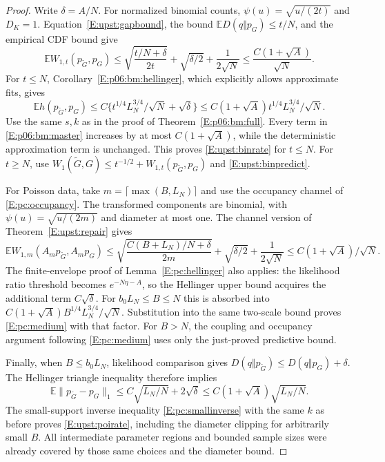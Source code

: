 \documentclass[11pt,a4paper]{article}
\theoremstyle{definition}
\theoremstyle{remark}
\numberwithin{equation}{section}
\begin{document}
\begin{proof}
Write $\delta=A/N$.
For normalized binomial counts, $\psi(u)=\sqrt{u/(2t)}$ and
$D_K=1$. Equation~\eqref{E:upst:gapbound}, the bound
$\mathbb E D(q\Vert p_G)\le t/N$, and the empirical CDF bound give
\begin{equation}\label{E:upst:binpredict}
 \mathbb E W_{1,t}(p_{\widetilde G},p_G)
 \le \sqrt{\frac{t/N+\delta}{2t}}+
       \sqrt{\delta/2}+\frac1{2\sqrt N}
 \le\frac{C(1+\sqrt A)}{\sqrt N}.
\end{equation}
For $t\le N$, Corollary~\ref{E:p06:bm:hellinger}, which explicitly
allows approximate fits, gives
\[
 \mathbb E h(p_{\widetilde G},p_G)
 \le C\{t^{1/4}L_N^{3/4}/\sqrt N+\sqrt\delta\}
 \le C(1+\sqrt A)t^{1/4}L_N^{3/4}/\sqrt N.
\]
Use the same $s,k$ as in the proof of
Theorem~\ref{E:p06:bm:full}. Every term in
\eqref{E:p06:bm:master} increases by at most $C(1+\sqrt A)$, while the
deterministic approximation term is unchanged. This proves
\eqref{E:upst:binrate} for $t\le N$. For $t\ge N$, use
$W_1(\widetilde G,G)\le t^{-1/2}
 +W_{1,t}(p_{\widetilde G},p_G)$ and \eqref{E:upst:binpredict}.

For Poisson data, take $m=\lceil\max(B,L_N)\rceil$ and use the
occupancy channel of \eqref{E:pc:occupancy}. The transformed components
are binomial, with $\psi(u)=\sqrt{u/(2m)}$ and diameter at most one.
The channel version of Theorem~\ref{E:upst:repair} gives
\[
 \mathbb E W_{1,m}(A_mp_{\widetilde G},A_mp_G)
 \le\sqrt{\frac{C(B+L_N)/N+\delta}{2m}}
       +\sqrt{\delta/2}+\frac1{2\sqrt N}
 \le C(1+\sqrt A)/\sqrt N.
\]
The finite-envelope proof of Lemma~\ref{E:pc:hellinger} also applies:
the likelihood ratio threshold becomes $e^{-N\eta-A}$, so the
Hellinger upper bound acquires the additional term $C\sqrt\delta$.
For $b_0L_N\le B\le N$ this is absorbed into
$C(1+\sqrt A)B^{1/4}L_N^{3/4}/\sqrt N$. Substitution into the same
two-scale bound proves \eqref{E:pc:medium} with that factor.
For $B>N$, the coupling and occupancy argument following
\eqref{E:pc:medium} uses only the just-proved predictive bound.

Finally, when $B\le b_0L_N$, likelihood comparison gives
$D(q\Vert p_{\widetilde G})\le D(q\Vert p_G)+\delta$.
The Hellinger triangle inequality therefore implies
\[
 \mathbb E\|p_{\widetilde G}-p_G\|_1
       \le C\sqrt{L_N/N}+2\sqrt\delta
       \le C(1+\sqrt A)\sqrt{L_N/N}.
\]
The small-support inverse inequality \eqref{E:pc:smallinverse} with
the same $k$ as before proves \eqref{E:upst:poirate}, including the
diameter clipping for arbitrarily small $B$. All intermediate parameter
regions and bounded sample sizes were already covered by those same
choices and the diameter bound.
\end{proof}
\end{document}
